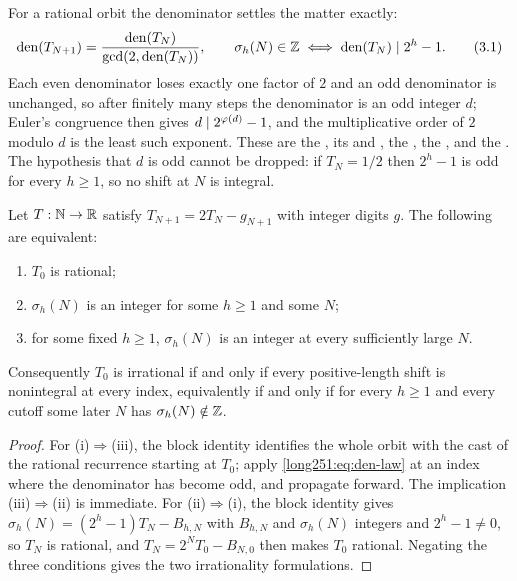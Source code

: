 \documentclass[11pt]{article}
\begin{document}
For a rational orbit the denominator settles the matter exactly:
\begin{equation}
 \operatorname{den}(T_{N+1})
 =\frac{\operatorname{den}(T_N)}{\gcd(2,\operatorname{den}(T_N))},
 \qquad
 \sigma_h(N)\in\Z
 \iff
 \operatorname{den}(T_N)\mid 2^h-1 .
\tag{3.1}\label{long251:eq:den-law}
\end{equation}
Each even denominator loses exactly one factor of $2$ and an odd denominator is
unchanged, so after finitely many steps the denominator is an odd integer $d$;
Euler's congruence then gives $d\mid2^{\varphi(d)}-1$, and the multiplicative order
of $2$ modulo $d$ is the least such exponent.  These are the
, its
 and
, the
, the
, and the
.  The hypothesis that $d$ is odd
cannot be dropped: if $T_N=1/2$ then $2^{h}-1$ is odd for every $h\ge1$, so no
shift at $N$ is integral.

\begin{theorem}\label{long251:res:escape-irrational}
Let $T:\mathbb{N}\to\mathbb{R}$ satisfy $T_{N+1}=2T_N-g_{N+1}$ with integer digits $g$.  The
following are equivalent:
\begin{enumerate}[label=\textup{(\roman*)}]
\item $T_0$ is rational;
\item $\sigma_h(N)$ is an integer for some $h\ge1$ and some $N$;
\item for some fixed $h\ge1$, $\sigma_h(N)$ is an integer at every
  sufficiently large $N$.
\end{enumerate}
Consequently $T_0$ is irrational if and only if every positive-length shift is
nonintegral at every index, equivalently if and only if for every $h\ge1$ and
every cutoff some later $N$ has $\sigma_h(N)\notin\mathbb{Z}$.
\end{theorem}

\begin{proof}
For \textup{(i)}$\Rightarrow$\textup{(iii)}, the block identity identifies the
whole orbit with the cast of the rational recurrence starting at $T_0$; apply
\eqref{long251:eq:den-law} at an index where the denominator has become odd, and
propagate forward.  The implication
\textup{(iii)}$\Rightarrow$\textup{(ii)} is immediate.  For
\textup{(ii)}$\Rightarrow$\textup{(i)}, the block identity gives
$\sigma_h(N)=(2^h-1)T_N-B_{h,N}$ with $B_{h,N}$ and $\sigma_h(N)$ integers and
$2^h-1\ne0$, so $T_N$ is rational, and $T_N=2^NT_0-B_{N,0}$ then makes $T_0$
rational.  Negating the three conditions gives the two irrationality
formulations.
\end{proof}
\end{document}
